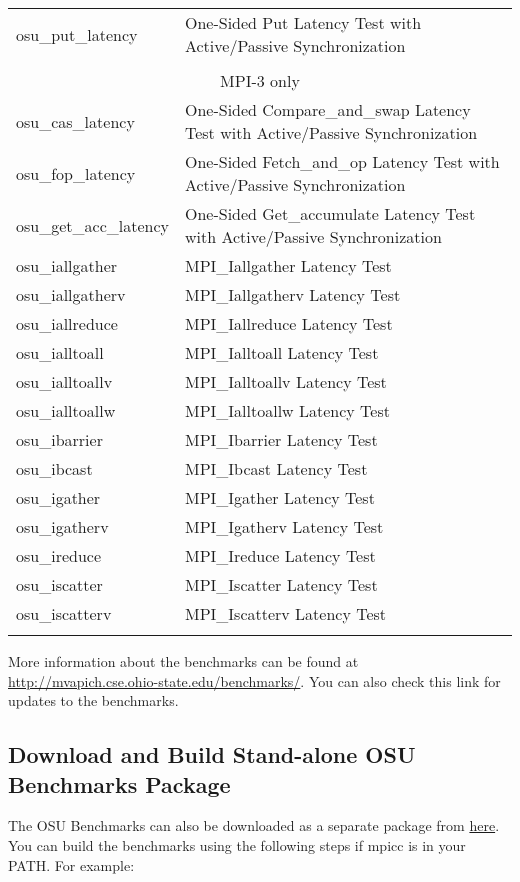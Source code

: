 \begin{center}
\begin{tabular}{ll}
osu\_put\_latency & One-Sided Put Latency Test with Active/Passive Synchronization\\
&\\
\multicolumn{2}{c}{MPI-3 only}\\
\hline
osu\_cas\_latency & One-Sided Compare\_and\_swap Latency Test with
Active/Passive Synchronization\\
osu\_fop\_latency & One-Sided Fetch\_and\_op Latency Test with Active/Passive
Synchronization\\
osu\_get\_acc\_latency & One-Sided Get\_accumulate Latency Test with
Active/Passive Synchronization\\
osu\_iallgather & MPI\_Iallgather Latency Test \\
osu\_iallgatherv & MPI\_Iallgatherv Latency Test \\
osu\_iallreduce & MPI\_Iallreduce Latency Test \\
osu\_ialltoall & MPI\_Ialltoall Latency Test \\
osu\_ialltoallv & MPI\_Ialltoallv Latency Test \\
osu\_ialltoallw & MPI\_Ialltoallw Latency Test \\
osu\_ibarrier & MPI\_Ibarrier Latency Test \\
osu\_ibcast & MPI\_Ibcast Latency Test \\
osu\_igather & MPI\_Igather Latency Test \\
osu\_igatherv & MPI\_Igatherv Latency Test \\
osu\_ireduce & MPI\_Ireduce Latency Test \\
osu\_iscatter & MPI\_Iscatter Latency Test \\
osu\_iscatterv & MPI\_Iscatterv Latency Test \\
&\\

\end{tabular}
\end{center}

\noindent More information about the benchmarks can be found at
\href{http://mvapich.cse.ohio-state.edu/benchmarks/}{http://mvapich.cse.ohio-state.edu/benchmarks/}.
You can also check this link for updates to the benchmarks.

\subsection{Download and Build Stand-alone OSU Benchmarks Package} 

The OSU Benchmarks can also be downloaded as a separate package from
\href{http://mvapich.cse.ohio-state.edu/benchmarks/}{here}.
You can build the benchmarks using the following steps if
mpicc is in your PATH. For example:

